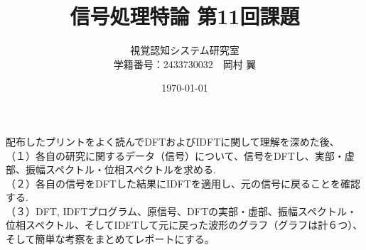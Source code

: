 \documentclass[10pt,dvipdfmx]{jsarticle}
\begin{document}
\title{信号処理特論 第11回課題}
\author{視覚認知システム研究室\\学籍番号：2433730032　岡村 翼}
\date{\today}
\maketitle

{ }
配布したプリントをよく読んでDFTおよびIDFTに関して理解を深めた後、\\
（１）各自の研究に関するデータ（信号）について、信号をDFTし、実部・虚部、振幅スペクトル・位相スペクトルを求める.\\
（２）各自の信号をDFTした結果にIDFTを適用し、元の信号に戻ることを確認する.\\
（３）DFT, IDFTプログラム、原信号、DFTの実部・虚部、振幅スペクトル・位相スペクトル、そしてIDFTして元に戻った波形のグラフ（グラフは計６つ）、そして簡単な考察をまとめてレポートにする。\\
\end{document}

